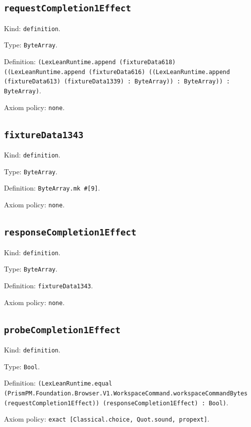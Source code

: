 \documentclass[11pt]{article}
\begin{document}
\subsection*{\texttt{requestCompletion1Effect}}
\noindent Kind: \texttt{definition}.\par
\noindent Type: \texttt{ByteArray}.\par
\noindent Definition: \texttt{(LexLeanRuntime.append (fixtureData618) ((LexLeanRuntime.append (fixtureData616) ((LexLeanRuntime.append (fixtureData613) (fixtureData1339) : ByteArray)) : ByteArray)) : ByteArray)}.\par
\noindent Axiom policy: \texttt{none}.\par
\subsection*{\texttt{fixtureData1343}}
\noindent Kind: \texttt{definition}.\par
\noindent Type: \texttt{ByteArray}.\par
\noindent Definition: \texttt{ByteArray.mk \#[9]}.\par
\noindent Axiom policy: \texttt{none}.\par
\subsection*{\texttt{responseCompletion1Effect}}
\noindent Kind: \texttt{definition}.\par
\noindent Type: \texttt{ByteArray}.\par
\noindent Definition: \texttt{fixtureData1343}.\par
\noindent Axiom policy: \texttt{none}.\par
\subsection*{\texttt{probeCompletion1Effect}}
\noindent Kind: \texttt{definition}.\par
\noindent Type: \texttt{Bool}.\par
\noindent Definition: \texttt{(LexLeanRuntime.equal (PrismPM.Foundation.Browser.V1.WorkspaceCommand.workspaceCommandBytes (requestCompletion1Effect)) (responseCompletion1Effect) : Bool)}.\par
\noindent Axiom policy: \texttt{exact [Classical.choice, Quot.sound, propext]}.\par
\end{document}
